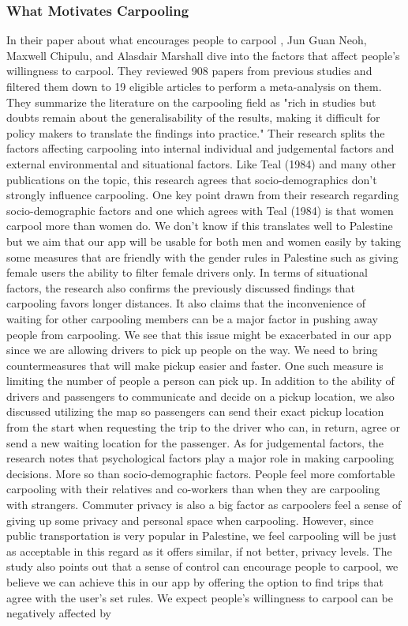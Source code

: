 \documentclass[a4paper, 12pt]{report} %
\begin{document}
            \subsubsection{What Motivates Carpooling}
                In their paper about what encourages people to carpool \cite{soton381789}, Jun Guan Neoh, Maxwell Chipulu, and Alasdair Marshall dive into the factors that affect people's willingness to carpool. They reviewed 908 papers from previous studies and filtered them down to 19 eligible articles to perform a meta-analysis on them. They summarize the literature on the carpooling field as "rich in studies but doubts remain about the generalisability of the results, making it difficult for policy makers to translate the findings into practice."
                Their research splits the factors affecting carpooling into internal individual and judgemental factors and external environmental and situational factors. Like Teal (1984) \cite{carpool_who_why_how} and many other publications on the topic, this research agrees that socio-demographics don't strongly influence carpooling.  One key point drawn from their research regarding socio-demographic factors and one which agrees with Teal (1984) \cite{carpool_who_why_how} is that women carpool more than women do. We don't know if this translates well to Palestine but we aim that our app will be usable for both men and women easily by taking some measures that are friendly with the gender rules in Palestine such as giving female users the ability to filter female drivers only. In terms of situational factors, the research also confirms the previously discussed findings that carpooling favors longer distances. It also claims that the inconvenience of waiting for other carpooling members can be a major factor in pushing away people from carpooling. We see that this issue might be exacerbated in our app since we are allowing drivers to pick up people on the way. We need to bring countermeasures that will make pickup easier and faster. One such measure is limiting the number of people a person can pick up. In addition to the ability of drivers and passengers to communicate and decide on a pickup location, we also discussed utilizing the map so passengers can send their exact pickup location from the start when requesting the trip to the driver who can, in return, agree or send a new waiting location for the passenger. As for judgemental factors, the research notes that psychological factors play a major role in making carpooling decisions. More so than socio-demographic factors. People feel more comfortable carpooling with their relatives and co-workers than when they are carpooling with strangers. Commuter privacy is also a big factor as carpoolers feel a sense of giving up some privacy and personal space when carpooling. However, since public transportation is very popular in Palestine, we feel carpooling will be just as acceptable in this regard as it offers similar, if not better, privacy levels. The study also points out that a sense of control can encourage people to carpool, we believe we can achieve this in our app by offering the option to find trips that agree with the user's set rules. We expect people's willingness to carpool can be negatively affected by 
\end{document}
